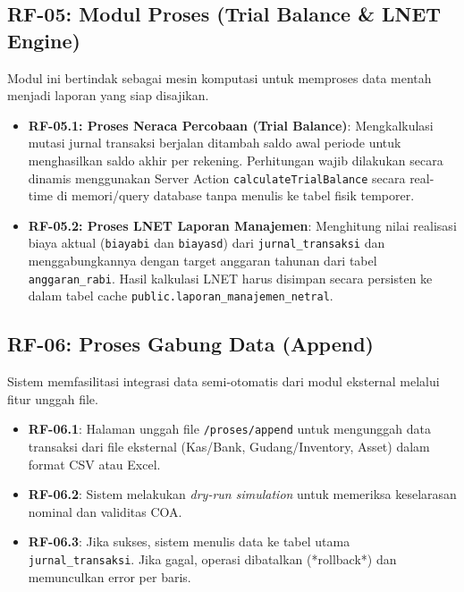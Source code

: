 \documentclass[11pt,a4paper]{article}
\begin{document}
\subsection{RF-05: Modul Proses (Trial Balance \& LNET Engine)}
Modul ini bertindak sebagai mesin komputasi untuk memproses data mentah menjadi laporan yang siap disajikan.
\begin{itemize}
    \item \textbf{RF-05.1: Proses Neraca Percobaan (Trial Balance)}: Mengkalkulasi mutasi jurnal transaksi berjalan ditambah saldo awal periode untuk menghasilkan saldo akhir per rekening. Perhitungan wajib dilakukan secara dinamis menggunakan Server Action \texttt{calculateTrialBalance} secara real-time di memori/query database tanpa menulis ke tabel fisik temporer.
    \item \textbf{RF-05.2: Proses LNET Laporan Manajemen}: Menghitung nilai realisasi biaya aktual (\texttt{biayabi} dan \texttt{biayasd}) dari \texttt{jurnal\_transaksi} dan menggabungkannya dengan target anggaran tahunan dari tabel \texttt{anggaran\_rabi}. Hasil kalkulasi LNET harus disimpan secara persisten ke dalam tabel cache \texttt{public.laporan\_manajemen\_netral}.
\end{itemize}

\subsection{RF-06: Proses Gabung Data (Append)}
Sistem memfasilitasi integrasi data semi-otomatis dari modul eksternal melalui fitur unggah file.
\begin{itemize}
    \item \textbf{RF-06.1}: Halaman unggah file \texttt{/proses/append} untuk mengunggah data transaksi dari file eksternal (Kas/Bank, Gudang/Inventory, Asset) dalam format CSV atau Excel.
    \item \textbf{RF-06.2}: Sistem melakukan \textit{dry-run simulation} untuk memeriksa keselarasan nominal dan validitas COA.
    \item \textbf{RF-06.3}: Jika sukses, sistem menulis data ke tabel utama \texttt{jurnal\_transaksi}. Jika gagal, operasi dibatalkan (*rollback*) dan memunculkan error per baris.
\end{itemize}
\end{document}
